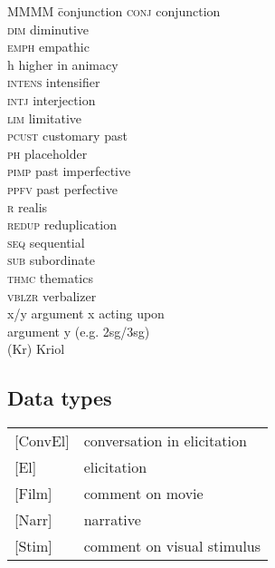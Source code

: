 \documentclass[output=paper]{langscibook}
\begin{document}
\begin{multicols}{2}
\begin{tabbing}
MMMM \= conjunction\kill
\textsc{conj} \>  conjunction\\
\textsc{dim} \>  diminutive\\
\textsc{emph} \>  empathic\\
h \>  higher in animacy\\
\textsc{intens} \>  intensifier\\
\textsc{intj} \>  interjection\\
\textsc{lim} \>  limitative\\
\textsc{pcust} \>  customary past\\
\textsc{ph} \>  placeholder\\
\textsc{pimp} \>  past imperfective\\
\textsc{ppfv} \>  past perfective\\
\textsc{r} \>  realis\\
\textsc{redup} \>  reduplication\\
\textsc{seq} \>  sequential\\
\textsc{sub} \>  subordinate\\
\textsc{thmc} \>  thematics\\
\textsc{vblzr} \>  verbalizer\\
x/y \>  argument x acting upon \\ \> argument y (e.g. 2sg/3sg)\\
(Kr) \>  Kriol
\end{tabbing}
\end{multicols}

\subsection*{Data types}

\begin{tabularx}{\textwidth}{@{}lQ@{}}
{[ConvEl]}& conversation in elicitation\\
{[El]}  & elicitation\\
{[Film]}& comment on movie\\
{[Narr]}& narrative\\
{[Stim]}& comment on visual stimulus\\
\end{tabularx}

\printbibliography[heading=subbibliography,notkeyword=this]
\end{document}
